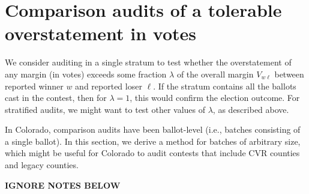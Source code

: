 \section{Comparison audits of a tolerable overstatement in votes}
\label{sec:comparisonError}

We consider auditing in a single stratum to test whether the overstatement of any margin
(in votes) exceeds some fraction $\lambda$ of the overall margin $V_{w\ell}$ between
reported winner $w$ and reported loser $\ell$.
If the stratum contains all the ballots cast in the contest, then for $\lambda = 1$, this 
would confirm the election outcome.
For stratified audits, we might want to test other values of $\lambda$, as described above.

In Colorado, comparison audits have been ballot-level (i.e., batches consisting of a single
ballot). 
In this section, we derive a method for batches of arbitrary size, which might be useful
for Colorado to audit contests that include CVR counties and legacy counties.


\bf{IGNORE NOTES BELOW}
